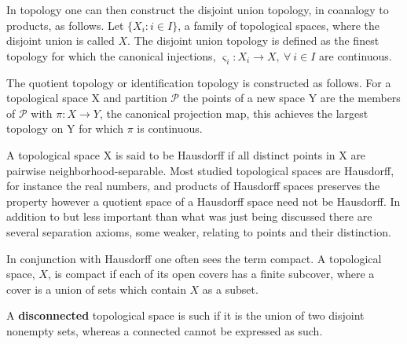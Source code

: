 \documentclass[../../main.tex]{subfiles}
\begin{document}
    In topology one can then construct the disjoint union topology, in coanalogy to products, as follows. Let $\{X_i : i \in I\}$, a family of topological spaces, where the disjoint union is called $X$. The disjoint union topology is defined as the finest topology for which the canonical injections, $\varsigma_i :X_i\to X, \: \forall\: i \in I$ are continuous.
    
    The quotient topology or identification topology is constructed as follows. For a topological space X and partition $\mathcal{P}$ the points of a new space Y are the members of $\mathcal{P}$ with $\pi:X\to Y$, the canonical projection map, this achieves the largest topology on Y for which $\pi$ is continuous.
    
    A topological space X is said to be Hausdorff if all distinct points in X are pairwise neighborhood-separable. Most studied topological spaces are Hausdorff, for instance the real numbers, and products of Hausdorff spaces preserves the property however a quotient space of a Hausdorff space need not be Hausdorff. In addition to but less important than what was just being discussed there are several separation axioms, some weaker, relating to points and their distinction. 
    
    In conjunction with Hausdorff one often sees the term compact. A topological space, $X$, is compact if each of its open covers has a finite subcover, where a cover is a union of sets which contain $X$ as a subset. 
    
    A \textbf{disconnected} topological space is such if it is the union of two disjoint nonempty sets, whereas a connected cannot be expressed as such. 
\end{document}
